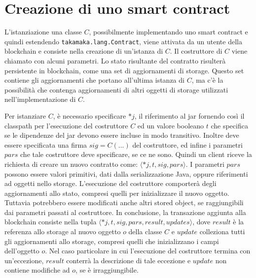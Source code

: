 \section{Creazione di uno smart contract} \label{takamaka:creazione-du-uno-smart-contract}
L'istanziazione una classe $C$, possibilmente implementando uno smart contract e quindi estendendo \lstinline|takamaka.lang.Contract|, viene attivata da un utente della blockchain e consiste nella creazione di un'istanza di $C$. Il costruttore di $C$ viene chiamato con alcuni parametri. Lo stato risultante del contratto risulterà persistente in blockchain, come una set di aggiornamenti di storage. Questo set contiene gli aggiornamenti che portano all'ultima istanza di $C$, ma c'è la possibilità che contenga aggiornamenti di altri oggetti di storage utilizzati nell'implementazione di $C$. 

Per istanziare $C$, è necessario specificare $*j$, il riferimento al jar fornendo così il classpath per l'esecuzione del costruttore $C$ ed un valore booleano $t$ che specifica se le dipendenze del jar devono essere incluse in modo transitivo. Inoltre deve essere specificata una firma $sig = C(\dots)$ del costruttore, ed infine i parametri $pars$ che tale costruttore deve specificare, se ce ne sono. Quindi un client riceve la richiesta di creare un nuovo contratto come: $\langle *j, t, sig, pars \rangle$. I parametri $pars$ possono essere valori primitivi, dati dalla serializzazione Java, oppure riferimenti ad oggetti nello storage. L'esecuzione del costruttore comporterà degli aggiornamenti allo stato, compresi quelli per inizializzare il nuovo oggetto. Tuttavia potrebbero essere modificati anche altri stored object, se raggiungibili dai parametri passati al costruttore. In conclusione, la transazione aggiunta alla blockchain consiste nella tupla $\langle *j, t, sig, pars, result, updates \rangle$, dove $result$ è la referenza allo storage al nuovo oggetto $o$ della classe $C$ e $update$ colleziona tutti gli aggiornamenti allo storage, compresi quelli che inizializzano i campi dell'oggetto $o$. Nel caso particolare in cui l'esecuzione del costruttore termina con un'eccezione, $result$ conterrà la descrizione di tale eccezione e $update$ non contiene modifiche ad $o$, se è irraggiungibile.

